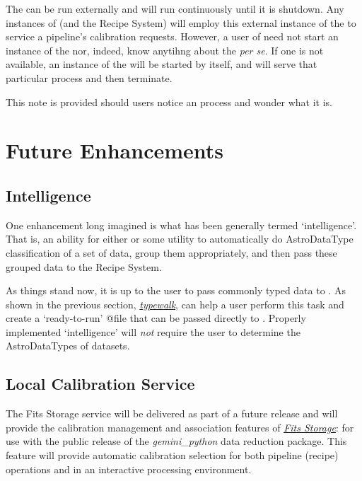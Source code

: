 \documentclass[letterpaper,10pt,english]{sphinxmanual}
\begin{document}
The  can be run externally and will run continuously until it is
shutdown. Any instances of  (and the Recipe System) will employ
this external instance of the  to service a pipeline's calibration
requests. However, a user of  need not start an instance of the
 nor, indeed, know anytihng about the  \emph{per se}. If one is not
available, an instance of the  will be started by  itself,
and will serve that particular  process and then terminate.

This note is provided should users notice an  process and wonder what
it is.


\section{Future Enhancements}
\label{discuss:future}\label{discuss:future-enhancements}

\subsection{Intelligence}
\label{discuss:intelligence}
One enhancement long imagined is what has been generally termed `intelligence'.
That is, an ability for either  or some utility to automatically do
AstroDataType classification of a set of data, group them appropriately, and
then pass these grouped data to the Recipe System.

As things stand now, it is up to the user to pass commonly typed data to
. As shown in the previous section, {\hyperref[supptools:typewalk]{\emph{typewalk}}}, 
can help a user perform this task and create a `ready-to-run' @file that can
be passed directly to . Properly implemented `intelligence' will
\emph{not} require the user to determine the AstroDataTypes of datasets.


\subsection{Local Calibration Service}
\label{discuss:local-calibration-service}
The Fits Storage service will be delivered as part of a future release and will
provide the calibration management and association features of {\hyperref[discuss:fitsstore]{\emph{Fits Storage}}}: for
use with the public release of the \emph{gemini\_python} data reduction package. This
feature will provide automatic calibration selection for both pipeline (recipe)
operations and in an interactive processing environment.
\end{document}
